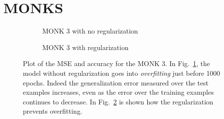 \begin{appendices}
\begin{listing}[!ht]
\inputminted{python}{code/high_api.py}
\caption{A high level API example on the Monk 1 dataset.}
\label{listing:high_api}
\end{listing}

\begin{listing}[!h]
\inputminted{python}{code/model_selection.py}
\caption{Model Selection API example on the CUP dataset.}
\label{listing:model_selection}
\end{listing}

\section{MONKS}
\label{appendix:monks}
\begin{figure}[H]
    \centering
                \begin{subfigure}{0.9\textwidth}
                    \caption{MONK 3 with no regularization}
                    \label{fig:monk3_app}
                \end{subfigure}
                \begin{subfigure}{0.9\textwidth}
                    \caption{MONK 3 with regularization}
                    \label{fig:monk3_reg_app}
                \end{subfigure}
\caption{Plot of the MSE and accuracy for the MONK 3. In Fig.~\ref{fig:monk3_app}, the model without regularization goes into \emph{overfitting} just before 1000 epochs. Indeed the generalization error measured over the test examples increases, even as the error over the training examples continues to decrease. In Fig.~\ref{fig:monk3_reg_app} is shown how the regularization prevents overfitting.}
\label{fig:monk3_appendix} 
\end{figure}


\end{appendices}

